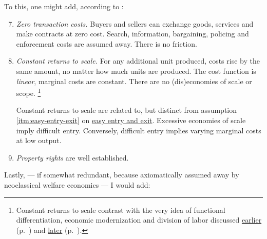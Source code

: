 To this, one might add, according to \citeauthor{Wikipedia2012}:
\begin{enumerate} \setcounter{enumi}{6}
	\item \emph{Zero transaction costs.}
	\label{itm:zero-transaction-costs}
	Buyers and sellers can exchange goods, services and make contracts at zero cost.
	Search, information, bargaining, policing and enforcement costs are assumed away.
	There is no friction.

	\item \emph{Constant returns to scale.}
	\label{itm:constant-returns-to-scale}
	For any additional unit produced, costs rise by the same amount, no matter how much units are produced.
	The cost function is \emph{linear}, marginal costs are constant.
	There are no (dis)economies of scale or scope.
	\footnote{
		Constant returns to scale contrast with the very idea of functional differentiation, economic modernization and division of labor discussed \hyperref[sec:modernity]{earlier} (p.~\pageref{sec:modernity}) and \hyperref[sec:growth-solidarity]{later} (p.~\pageref{sec:growth-solidarity}).
	}

	Constant returns to scale are related to, but distinct from assumption \ref{itm:easy-entry-exit} on \hyperref[itm:easy-entry-exit]{easy entry and exit}.
	Excessive economies of scale imply difficult entry.
	Conversely, difficult entry implies varying marginal costs at low output.

	\item \emph{Property rights}
	\label{itm:property-rights}
	are well established.
\end{enumerate}

Lastly, --- if somewhat redundant, because axiomatically assumed away by neoclassical welfare economics --- I would add:

